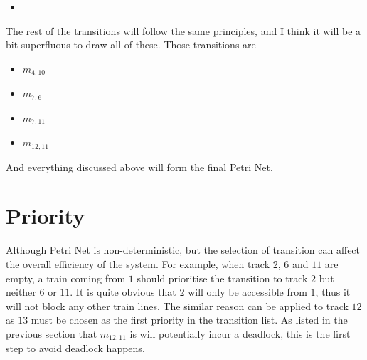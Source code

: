 \documentclass[12pt]{article}
\begin{document}
\begin{itemize}
  \item
\end{itemize}

The rest of the transitions will follow the same principles, and I think it will be a bit superfluous to draw all of these. Those transitions are

\begin{itemize}
  \item $m_{4,10}$
  \item $m_{7,6}$
  \item $m_{7,11}$
  \item $m_{12,11}$
\end{itemize}

And everything discussed above will form the final Petri Net.

\section{Priority}

Although Petri Net is non-deterministic, but the selection of transition can affect the overall efficiency of the system. For example, when track $2$, $6$ and $11$ are empty, a train coming from $1$ should prioritise the transition to track $2$ but neither $6$ or $11$. It is quite obvious that $2$ will only be accessible from $1$, thus it will not block any other train lines. The similar reason can be applied to track $12$ as $13$ must be chosen as the first priority in the transition list. As listed in the previous section that $m_{12,11}$ is will potentially incur a deadlock, this is the first step to avoid deadlock happens.
\end{document}
